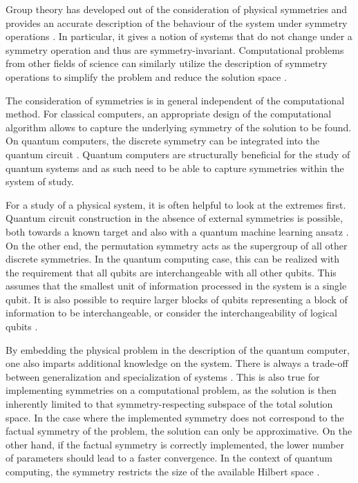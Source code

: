 \documentclass[%
 reprint,
 amsmath,amssymb,
 aps,
]{revtex4-2}
\theoremstyle{definition}%
\begin{document}
Group theory has developed out of the consideration of physical symmetries and provides an accurate description of the behaviour of the system under symmetry operations \cite{sternberg_group_1995}. In particular, it gives a notion of systems that do not change under a symmetry operation and thus are symmetry-invariant. Computational problems from other fields of science can similarly utilize the description of symmetry operations to simplify the problem and reduce the solution space \cite{hamermesh_group_2012}.

The consideration of symmetries is in general independent of the computational method. For classical computers, an appropriate design of the computational algorithm allows to capture the underlying symmetry of the solution to be found. On quantum computers, the discrete symmetry can be integrated into the quantum circuit \cite{larocca_group-invariant_2022, meyer_exploiting_2023}. Quantum computers are structurally beneficial for the study of quantum systems \cite{georgescu_quantum_2014} and as such need to be able to capture symmetries within the system of study.

For a study of a physical system, it is often helpful to look at the extremes first. Quantum circuit construction in the absence of external symmetries is possible, both towards a known target \cite{mansky_near-optimal_2023} and also with a quantum machine learning ansatz \cite{schuld_introduction_2015}. On the other end, the permutation symmetry acts as the supergroup of all other discrete symmetries. In the quantum computing case, this can be realized with the requirement that all qubits are interchangeable with all other qubits. This assumes that the smallest unit of information processed in the system is a single qubit. It is also possible to require larger blocks of qubits representing a block of information to be interchangeable, or consider the interchangeability of logical qubits \cite{nigg_quantum_2014}. 

By embedding the physical problem in the description of the quantum computer, one also imparts additional knowledge on the system. There is always a trade-off between generalization and specialization of systems \cite{giles_learning_1987}. This is also true for implementing symmetries on a computational problem, as the solution is then inherently limited to that symmetry-respecting subspace of the total solution space. In the case where the implemented symmetry does not correspond to the factual symmetry of the problem, the solution can only be approximative. On the other hand, if the factual symmetry is correctly implemented, the lower number of parameters should lead to a faster convergence. In the context of quantum computing, the symmetry restricts the size of the available Hilbert space \cite{ragone_unified_2023}. 
\end{document}
